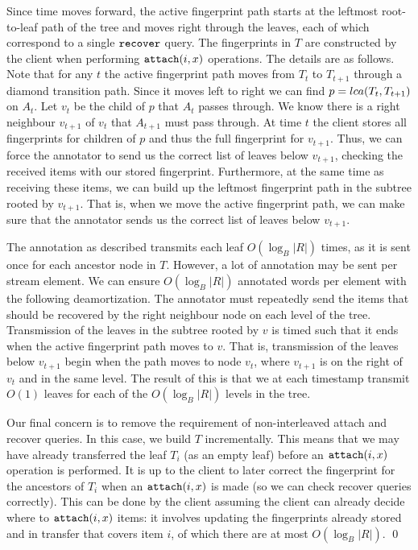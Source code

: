     Since time moves forward, the active fingerprint path starts at the leftmost root-to-leaf path of the tree and moves right through the leaves, each of which correspond to a single $\mathtt{recover}$ query. The fingerprints in $T$ are constructed by the client when performing $\mathtt{attach}(i, x)$ operations. The details are as follows.
    Note that for any $t$ the active fingerprint path moves from $T_t$ to $T_{t+1}$ through a diamond transition path. Since it moves left to right we can find $p = lca(T_t, T_{t+1})$ on $A_t$. Let $v_t$ be the child of $p$ that $A_t$ passes through. We know there is a right neighbour $v_{t+1}$ of $v_t$ that $A_{t+1}$ must pass through. At time $t$ the client stores all fingerprints for children of $p$ and thus the full fingerprint for $v_{t+1}$. 
    Thus, we can force the annotator to send us the correct list of leaves below $v_{t+1}$, checking the received items with our stored fingerprint. Furthermore, at the same time as receiving these items, we can build up the leftmost fingerprint path in the subtree rooted by $v_{t+1}$. That is, when we move the active fingerprint path, we can make sure that the annotator sends us the correct list of leaves below $v_{t+1}$.
    
    The annotation as described transmits each leaf $O(\log_B |R|)$ times, as it is sent once for each ancestor node in $T$. However, a lot of annotation may be sent per stream element. We can ensure $O(\log_B |R|)$ annotated words per element with the following deamortization. The annotator must repeatedly send the items that should be recovered by the right neighbour node on each level of the tree. Transmission of the leaves in the subtree rooted by $v$ is timed such that it ends when the active fingerprint path moves to $v$. That is, transmission of the leaves below $v_{t+1}$ begin when the path moves to node $v_t$, where $v_{t+1}$ is on the right of $v_t$ and in the same level. The result of this is that we at each timestamp transmit $O(1)$ leaves for each of the $O(\log_B |R|)$ levels in the tree.
    
    Our final concern is to remove the requirement of non-interleaved attach and recover queries. In this case, we build $T$ incrementally. This means that we may have already transferred the leaf $T_i$ (as an empty leaf) before an $\mathtt{attach}(i, x)$ operation is performed.  %
    It is up to the client to later correct the fingerprint for the ancestors of $T_i$ when an $\mathtt{attach}(i, x)$ is made (so we can check recover queries correctly). This can be done by the client assuming the client can already decide where to $\mathtt{attach}(i, x)$ items: it involves updating the fingerprints already stored and in transfer that covers item $i$, of which there are at most $O(\log_B |R|)$.  \qed
    


